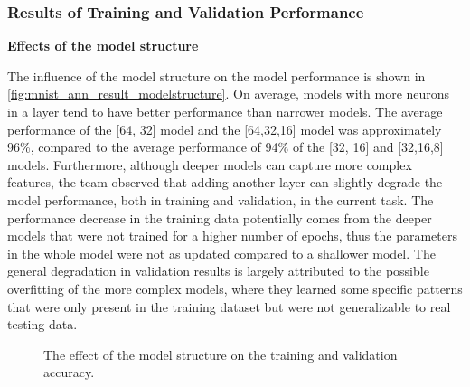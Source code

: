 \documentclass[a4paper]{article}
\begin{document}
\subsubsection{Results of Training and Validation Performance} \label{ann_model_result_hyperparameter}
\textbf{Effects of the model structure}

The influence of the model structure on the model performance is shown in \autoref{fig:mnist_ann_result_modelstructure}. On average, models with more neurons in a layer tend to have better performance than narrower models. The average performance of the [64, 32] model and the [64,32,16] model was approximately 96\%, compared to the average performance of 94\% of the [32, 16] and [32,16,8] models. Furthermore, although deeper models can capture more complex features, the team observed that adding another layer can slightly degrade the model performance, both in training and validation, in the current task. The performance decrease in the training data potentially comes from the deeper models that were not trained for a higher number of epochs, thus the parameters in the whole model were not as updated compared to a shallower model. The general degradation in validation results is largely attributed to the possible overfitting of the more complex models, where they learned some specific patterns that were only present in the training dataset but were not generalizable to real testing data.

\begin{figure} [h!]
    \caption{The effect of the model structure on the training and validation accuracy.} 
    \label{fig:mnist_ann_result_modelstructure}
\end{figure}
\end{document}

